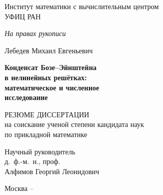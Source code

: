 \documentclass[candidate, href, colorlinks]{disser}
\begin{document}
\begin{titlepage}
\thispagestyle{empty}
\enlargethispage{1cm}
\vspace*{-2cm}

\begin{center}
	Институт математики с вычислительным центром \\ УФИЦ РАН
\end{center}

\vskip1cm
	
\begin{flushright}
	\emph{На правах рукописи}
\end{flushright}
	
\vskip3cm

\begin{center}
	{\large Лебедев Михаил Евгеньевич}
	\vskip1cm
	{\Large\bfseries Конденсат Бозе--Эйнштейна \\ в нелинейных решётках: \\ математическое и численное \\ исследование \par}
	\vskip1.5cm
	{РЕЗЮМЕ ДИССЕРТАЦИИ \\ на соискание ученой степени кандидата наук \\ по прикладной математике}
\end{center}

\vskip2cm

\hspace{8cm}\begin{minipage}{0.4\linewidth}
	Научный руководитель \\
	д.~ф.-м.~н., проф. \\
	Алфимов Георгий Леонидович
\end{minipage}

\vfill

\begin{center}
	{Москва -- \the\year}
\end{center}

\normalfont\clearpage
\end{titlepage}
\end{document}
